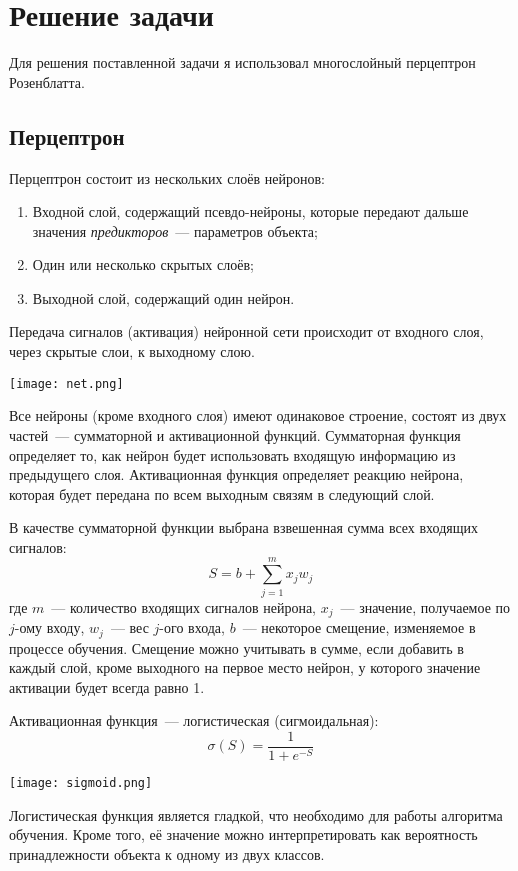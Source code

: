 \section{Решение задачи}
	Для решения поставленной задачи я использовал многослойный перцептрон Розенблатта.

\subsection{Перцептрон}
	Перцептрон состоит из нескольких слоёв нейронов:
	\begin{enumerate}
		\item Входной слой, содержащий псевдо-нейроны, которые передают дальше значения \textit{предикторов}~--- параметров объекта;
		\item Один или несколько скрытых слоёв;
		\item Выходной слой, содержащий один нейрон.
	\end{enumerate}

	Передача сигналов (активация) нейронной сети происходит от входного слоя, через скрытые слои, к выходному слою.
	\parskip=0cm
	
	\texttt{[image: net.png]}
	\parskip=0.2cm

	Все нейроны (кроме входного слоя) имеют одинаковое строение, состоят из двух частей~--- сумматорной и активационной функций.
	Сумматорная функция определяет то, как нейрон будет использовать входящую информацию из предыдущего слоя.
	Активационная функция определяет реакцию нейрона, которая будет передана по всем выходным связям в следующий слой.

	В качестве сумматорной функции выбрана взвешенная сумма всех входящих сигналов:
	\[
		S = b + \sum_{j = 1}^m x_j w_j
	\]
	где $m$~--- количество входящих сигналов нейрона, $x_j$~--- значение, получаемое по $j$-ому входу, $w_j$~--- вес $j$-ого входа,
	$b$~--- некоторое смещение, изменяемое в процессе обучения.	Смещение можно учитывать в сумме,
	если добавить в каждый слой, кроме выходного на первое место нейрон, у которого значение активации будет всегда равно 1.

	Активационная функция~--- логистическая (сигмоидальная):
	\[
		\sigma\left(S\right) = \frac{1}{1 + e^{-S}}
	\]
	\parskip=0cm

	\texttt{[image: sigmoid.png]}
	\parskip=0.2cm

	Логистическая функция является гладкой, что необходимо для работы алгоритма обучения. Кроме того, её значение можно
	интерпретировать как вероятность принадлежности объекта к одному из двух классов.

